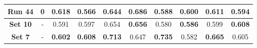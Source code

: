 \begin{table}[!ht]
\begin{tabular}{|c|c|cc|cc|cc|cc|}
			\textbf{Run 44} & 0 & 0.618 & 0.566 & 0.644 & \textbf{0.686} & 0.588 & 0.600 & 0.611 & 0.594 \\
			
			\hline
			
			\textbf{Set 10} & - & 0.591 & 0.597 & 0.654 & \textbf{0.656} & 0.580 & \textbf{0.586} & 0.599 & \textbf{0.608} \\
			
			\hline
			\hline
			
			\textbf{Set 7} & - & \textbf{0.602} & \textbf{0.608} & \textbf{0.713} & 0.647 & \textbf{0.735} & 0.582 & \textbf{0.665} & 0.605 \\
			
			\hline
			
	\end{tabular}
	\label{tab:Experiment2IRF}
\end{table}

